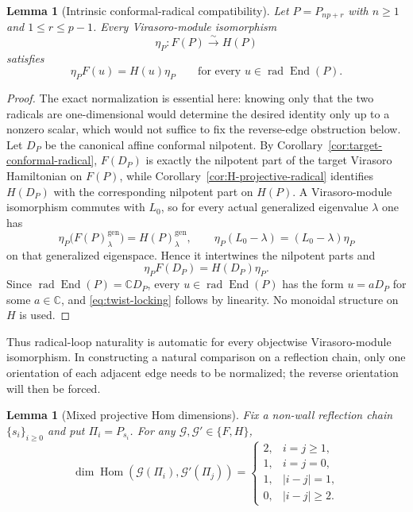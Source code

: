 \documentclass[12pt,leqno]{amsart}
\numberwithin{equation}{section}
\newtheorem{lem}[thm]{Lemma}
\newcommand{\End}{\operatorname{End}}
\newcommand{\Hom}{\operatorname{Hom}}
\newcommand{\rad}{\operatorname{rad}}
\def\C{\mathbb{C}}
\begin{document}
\begin{lem}[Intrinsic conformal-radical compatibility]
\label{lem:twist-locking}
Let $P=P_{np+r}$ with $n\ge1$ and $1\le r\le p-1$.  Every
Virasoro-module isomorphism
\[
 \eta_P:F(P)\xrightarrow{\sim}H(P)
\]
satisfies
\begin{equation}\label{eq:twist-locking}
 \eta_PF(u)=H(u)\eta_P
 \qquad\text{for every }u\in\rad\End(P).
\end{equation}
\end{lem}

\begin{proof}
The exact normalization is essential here: knowing only that the two
radicals are one-dimensional would determine the desired identity only up
to a nonzero scalar, which would not suffice to fix the reverse-edge
obstruction below.  Let $D_P$ be the canonical affine conformal nilpotent.
By Corollary~\ref{cor:target-conformal-radical}, $F(D_P)$ is exactly the
nilpotent part of the target Virasoro Hamiltonian on $F(P)$, while
Corollary~\ref{cor:H-projective-radical} identifies $H(D_P)$ with the
corresponding nilpotent part on $H(P)$.  A Virasoro-module isomorphism commutes with $L_0$, so for every actual
generalized eigenvalue $\lambda$ one has
\[
 \eta_P\bigl(F(P)^{\mathrm{gen}}_\lambda\bigr)
 =H(P)^{\mathrm{gen}}_\lambda,
 \qquad
 \eta_P(L_0-\lambda)=(L_0-\lambda)\eta_P
\]
on that generalized eigenspace.  Hence it intertwines the nilpotent parts
and
\[
 \eta_PF(D_P)=H(D_P)\eta_P.
\]
Since $\rad\End(P)=\C D_P$, every $u\in\rad\End(P)$ has the form
$u=aD_P$ for some $a\in\C$, and \eqref{eq:twist-locking} follows by
linearity.  No monoidal structure on $H$ is used.
\end{proof}

Thus radical-loop naturality is automatic for every objectwise
Virasoro-module isomorphism.  In constructing a natural comparison on a
reflection chain, only one orientation of each adjacent edge needs to be
normalized; the reverse orientation will then be forced.

\begin{lem}[Mixed projective Hom dimensions]
\label{lem:mixed-projective-Hom}
Fix a non-wall reflection chain $\{s_i\}_{i\ge0}$ and put
$\Pi_i=P_{s_i}$.  For any $\mathscr G,\mathscr G'\in\{F,H\}$,
\[
 \dim\Hom(\mathscr G(\Pi_i),\mathscr G'(\Pi_j))
 =
 \begin{cases}
  2,&i=j\ge1,\\
  1,&i=j=0,\\
  1,&|i-j|=1,\\
  0,&|i-j|\ge2.
 \end{cases}
\]
\end{lem}
\end{document}
